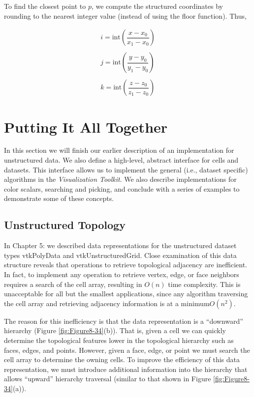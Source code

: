 To find the closest point to $p$, we compute the structured coordinates by rounding to the nearest integer value (instead of using the floor function). Thus,

\begin{equation}\label{eq:8.31}
\begin{array}{lll}
i = \text{int}\left( \dfrac{x-x_0}{x_1 - x_0} \right) \\ \\
j = \text{int}\left( \dfrac{y-y_0}{y_1 - y_0} \right) \\ \\
k = \text{int}\left( \dfrac{z-z_0}{z_1 - z_0} \right)
\end{array}
\end{equation}

\section{Putting It All Together}

In this section we will finish our earlier description of an implementation for unstructured data. We also define a high-level, abstract interface for cells and datasets. This interface allows us to implement the general (i.e., dataset specific) algorithms in the \emph{Visualization Toolkit}. We also describe
implementations for color scalars, searching and picking, and conclude with a series of examples to demonstrate some of these concepts.

\subsection{Unstructured Topology}

In Chapter 5:  we described data representations for the unstructured dataset types vtkPolyData and vtkUnstructuredGrid. Close examination of this data structure reveals that operations to retrieve topological adjacency are inefficient. In fact, to implement any operation to retrieve vertex, edge, or face neighbors requires a search of the cell array, resulting in $O(n)$ time complexity. This is unacceptable for all but the smallest applications, since any algorithm traversing the cell array and retrieving adjacency information is at a minimum$ O(n^2)$.

The reason for this inefficiency is that the data representation is a ``downward'' hierarchy (Figure \ref{fig:Figure8-34}(b)). That is, given a cell we can quickly determine the topological features lower in the topological hierarchy such as faces, edges, and points. However, given a face, edge, or point we must search the cell array to determine the owning cells. To improve the efficiency of this data representation, we must introduce additional information into the hierarchy that allows “upward” hierarchy traversal (similar to that shown in Figure \ref{fig:Figure8-34}(a)).


